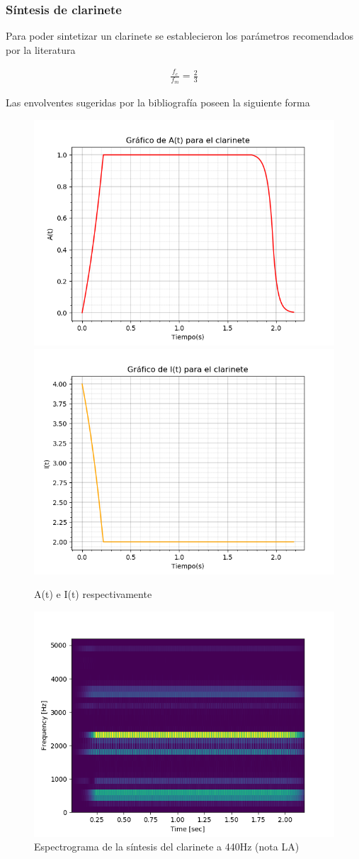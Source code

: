 \documentclass[assd_tp2_main.tex]{subfiles}
\begin{document}
\subsubsection{Síntesis de clarinete}
Para poder sintetizar un clarinete se establecieron los parámetros recomendados por la literatura
 
\begin{eqnarray*}
\displaystyle \frac{f_c}{f_m}=\frac{2}{3}
\end{eqnarray*}

Las envolventes sugeridas por la bibliografía poseen la siguiente forma
\begin{figure}[H]
\centering
\includegraphics[width=0.4\linewidth]{graficos/EJ4/at_clarinet.png}
\includegraphics[width=0.4\linewidth]{graficos/EJ4/it_clarinet.png}
\caption{A(t) e I(t) respectivamente}
\label{fig:clarinet_envelopes}
\end{figure}

\begin{figure}[H]
\centering
\includegraphics[width=0.4\linewidth]{graficos/EJ4/ClarinetEspectogram440Hz.png}
\caption{Espectrograma de la síntesis del clarinete a 440Hz (nota LA)}
\label{fig:clarinet_440}
\end{figure}
\end{document}
